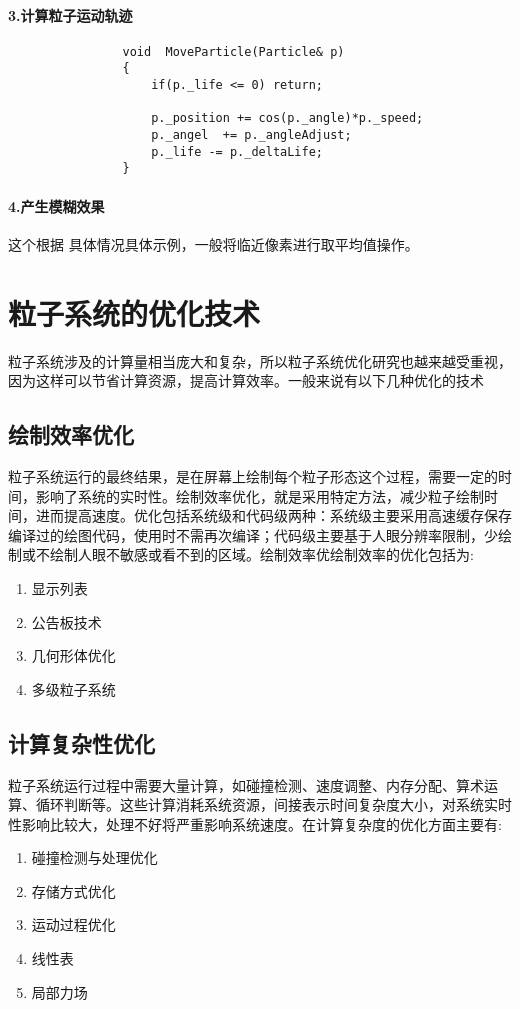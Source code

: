 \documentclass[UTF8,a4paper,14pt]{ctexart}
\begin{document}
		\paragraph{3.计算粒子运动轨迹}
			\begin{lstlisting}
				void  MoveParticle(Particle& p)
				{
					if(p._life <= 0) return;
					
					p._position += cos(p._angle)*p._speed;
					p._angel  += p._angleAdjust;
					p._life -= p._deltaLife;
				}
			\end{lstlisting}
			
		\paragraph{4.产生模糊效果}
			这个根据 具体情况具体示例，一般将临近像素进行取平均值操作。
\newpage
\section{粒子系统的优化技术}
	粒子系统涉及的计算量相当庞大和复杂，所以粒子系统优化研究也越来越受重视，因为这样可以节省计算资源，提高计算效率。一般来说有以下几种优化的技术
	
	\subsection{绘制效率优化}
		粒子系统运行的最终结果，是在屏幕上绘制每个粒子形态这个过程，需要一定的时间，影响了系统的实时性。绘制效率优化，就是采用特定方法，减少粒子绘制时间，进而提高速度。优化包括系统级和代码级两种：系统级主要采用高速缓存保存编译过的绘图代码，使用时不需再次编译；代码级主要基于人眼分辨率限制，少绘制或不绘制人眼不敏感或看不到的区域。绘制效率优绘制效率的优化包括为:
			\begin{enumerate}[fullwidth, itemindent= 2em]
				\item 显示列表
				\item 公告板技术
				\item 几何形体优化
				\item 多级粒子系统
			\end{enumerate}
	
	\subsection{计算复杂性优化}
		粒子系统运行过程中需要大量计算，如碰撞检测、速度调整、内存分配、算术运算、循环判断等。这些计算消耗系统资源，间接表示时间复杂度大小，对系统实时性影响比较大，处理不好将严重影响系统速度。在计算复杂度的优化方面主要有:
			\begin{enumerate}[fullwidth, itemindent= 2em]
				\item 碰撞检测与处理优化
				\item 存储方式优化
				\item 运动过程优化
				\item 线性表
				\item 局部力场
			\end{enumerate}
			
\end{document}

